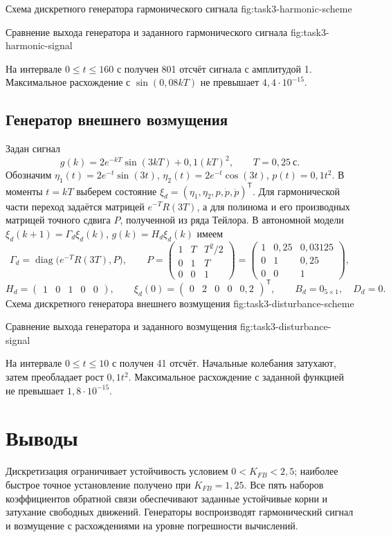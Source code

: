   {Схема дискретного генератора гармонического сигнала}
  {fig:task3-harmonic-scheme}

  {Сравнение выхода генератора и заданного гармонического сигнала}
  {fig:task3-harmonic-signal}

На интервале $0\leq t\leq160$ с получен 801 отсчёт сигнала
с амплитудой 1. Максимальное расхождение с $\sin(0{,}08kT)$
не превышает $4{,}4\cdot10^{-15}$.

\clearpage
\subsection{Генератор внешнего возмущения}

Задан сигнал
\[
  g(k)=2e^{-kT}\sin(3kT)+0{,}1(kT)^2,\qquad T=0{,}25\ \text{с}.
\]
Обозначим $\eta_1(t)=2e^{-t}\sin(3t)$,
$\eta_2(t)=2e^{-t}\cos(3t)$, $p(t)=0{,}1t^2$.
В моменты $t=kT$ выберем состояние
$\xi_d=(\eta_1,\eta_2,p,\dot p,\ddot p)^{\mathsf T}$.
Для гармонической части переход задаётся матрицей $e^{-T}R(3T)$,
а для полинома и его производных \textemdash{} матрицей точного
сдвига $P$, полученной из ряда Тейлора. В автономной модели
$\xi_d(k+1)=\Gamma_d\xi_d(k)$, $g(k)=H_d\xi_d(k)$ имеем
\[
  \Gamma_d=\operatorname{diag}\bigl(e^{-T}R(3T),P\bigr),
  \qquad
  P=\begin{pmatrix}
    1&T&T^2/2\\
    0&1&T\\
    0&0&1
  \end{pmatrix}
  =\begin{pmatrix}
    1&0{,}25&0{,}03125\\
    0&1&0{,}25\\
    0&0&1
  \end{pmatrix},
\]
\[
  H_d=\begin{pmatrix}1&0&1&0&0\end{pmatrix},\qquad
  \xi_d(0)=\begin{pmatrix}0&2&0&0&0{,}2\end{pmatrix}^{\mathsf T},
  \qquad B_d=0_{5\times1},\quad D_d=0.
\]
  {Схема дискретного генератора внешнего возмущения}
  {fig:task3-disturbance-scheme}

  {Сравнение выхода генератора и заданного возмущения}
  {fig:task3-disturbance-signal}

На интервале $0\leq t\leq10$ с получен 41 отсчёт.
Начальные колебания затухают, затем преобладает рост $0{,}1t^2$.
Максимальное расхождение с заданной функцией не превышает
$1{,}8\cdot10^{-15}$.

\section{Выводы}

Дискретизация ограничивает устойчивость условием $0<K_{FB}<2{,}5$;
наиболее быстрое точное установление получено при $K_{FB}=1{,}25$.
Все пять наборов коэффициентов обратной связи обеспечивают заданные
устойчивые корни и затухание свободных движений. Генераторы воспроизводят
гармонический сигнал и возмущение с расхождениями на уровне
погрешности вычислений.
